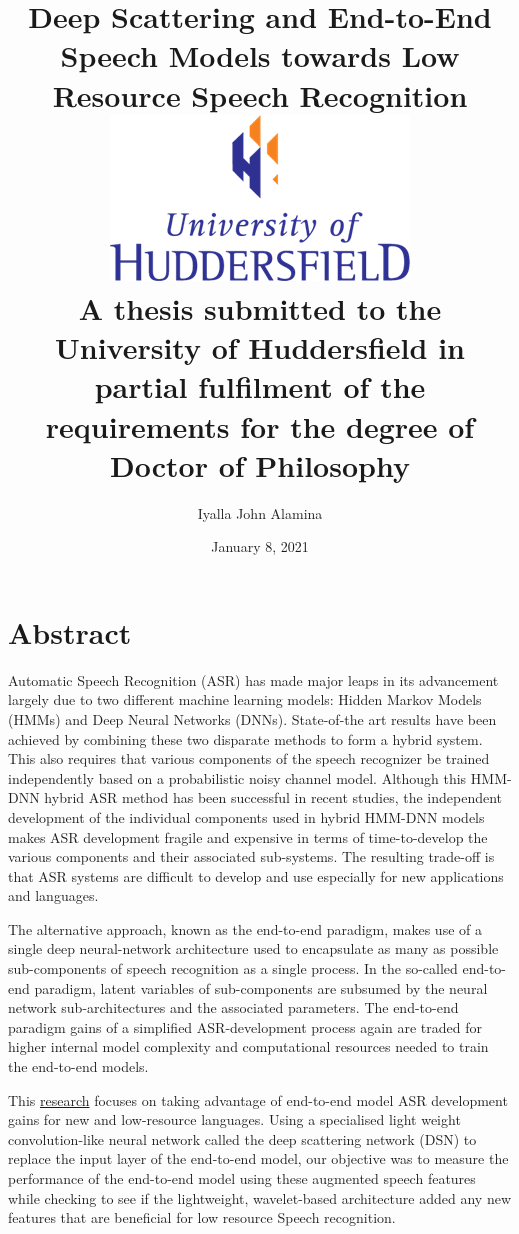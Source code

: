 \documentclass[12pt,twoside]{report}
\title{
    {Deep Scattering and End-to-End Speech Models towards Low Resource Speech Recognition}\\
    {\includegraphics{university.png}\\
A thesis submitted to the University of Huddersfield in partial fulfilment of the requirements for the degree of Doctor of Philosophy}
}
\author{Iyalla John Alamina}
\date{January 8, 2021}
\begin{document}
\makeglossaries


\maketitle
\DeclareRobustCommand{\startblue}{%
  \leavevmode
  \color{blue}
}
\DeclareRobustCommand{\stopblue}{%
  \normalcolor
}


\chapter*{Abstract}
\startblue
Automatic Speech Recognition (ASR) has made major leaps in its advancement largely due to two different machine learning models: Hidden Markov Models (HMMs) and Deep Neural Networks (DNNs).  State-of-the art results have been achieved by combining these two disparate methods to form a hybrid system.  This also requires that various components of the speech recognizer be trained independently based on a probabilistic noisy channel model.  Although this HMM-DNN hybrid ASR method has been successful in recent studies, the independent development of the individual components used in hybrid HMM-DNN models makes ASR development fragile and expensive in terms of time-to-develop the various components and their associated sub-systems.  The resulting trade-off is that ASR systems are difficult to develop and use especially for new applications and languages.

The alternative approach, known as the end-to-end paradigm, makes use of a single deep neural-network architecture used to encapsulate as many as possible sub-components of speech recognition as a single process.  In the so-called end-to-end paradigm, latent variables of sub-components are subsumed by the neural network sub-architectures and the associated parameters.  The end-to-end paradigm gains of a simplified ASR-development process again are traded for higher internal model complexity and computational resources needed to train the end-to-end models. 

This \href{https://docs.google.com/document/d/1ne2ctaxjpOlilMDg88aTtzOdIyP-wI2_ST5mGDvAYMw/edit?usp=sharing}{research} focuses on taking advantage of end-to-end model ASR development gains for new and low-resource languages. Using a specialised light weight convolution-like neural network called the deep scattering network (DSN) to replace the input layer of the end-to-end model, our objective was to measure the performance of the end-to-end model using these augmented speech features while checking to see if the lightweight, wavelet-based architecture added any new features that are beneficial for low resource Speech recognition. 
\end{document}

